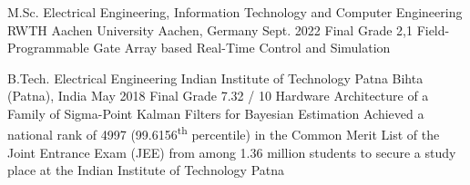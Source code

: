 
\begin{cveducation}

\cvschool
	{M.Sc.} %
	{Electrical Engineering, Information Technology and Computer Engineering} %
	{RWTH Aachen University} %
	{Aachen, Germany} %
	{Sept. 2022} %
	{Final Grade 2,1} %
	{Field-Programmable Gate Array based Real-Time Control and Simulation} %
	{} %

\cvschool
	{B.Tech.} %
	{Electrical Engineering} %
	{Indian Institute of Technology Patna} %
	{Bihta (Patna), India} %
	{May 2018} %
	{Final Grade 7.32 / 10} %
	{Hardware Architecture of a Family of Sigma-Point Kalman Filters for Bayesian Estimation} %
	{Achieved a national rank of 4997 (99.6156\textsuperscript{th} percentile) in the Common Merit List of the Joint Entrance Exam (JEE) from among 1.36 million students to secure a study place at the Indian Institute of Technology Patna} %



\end{cveducation}

